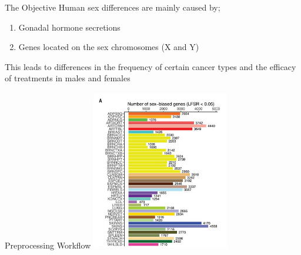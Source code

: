 \documentclass{beamer}
\begin{document}
	\begin{frame}{The Objective}
		Human sex differences are mainly caused by;
		\begin{enumerate}
			\item Gonadal hormone secretions
			\item Genes located on the sex chromosomes (X and Y) \newline
		\end{enumerate}
	This leads to differences in the frequency of certain cancer types and the efficacy of treatments in males and females
	\end{frame}

	\begin{frame}{Preprocessing Workflow}
		\centering
		\includegraphics[width=6cm,height=7cm]{sex.png}
	\end{frame}
\end{document}
